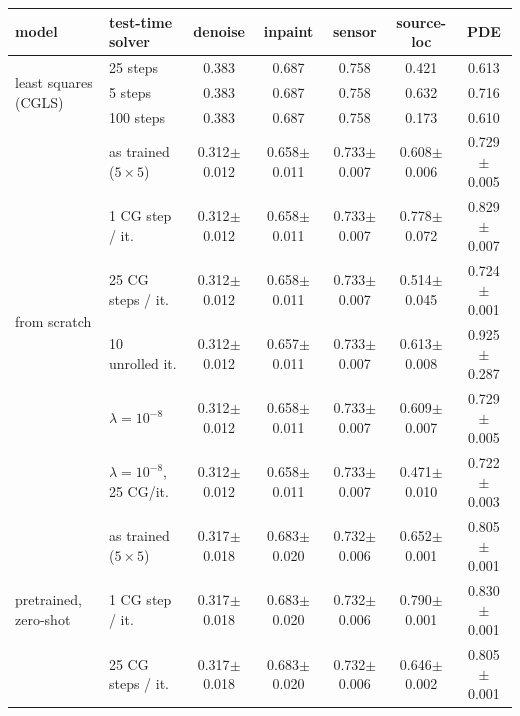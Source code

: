 \begin{tabular}{llccccc}
\toprule
model & test-time solver & denoise & inpaint & sensor & source-loc & PDE \\
\midrule
\multirow{3}{*}{least squares (CGLS)} & 25 steps & 0.383 & 0.687 & 0.758 & 0.421 & 0.613 \\
 & 5 steps & 0.383 & 0.687 & 0.758 & 0.632 & 0.716 \\
 & 100 steps & 0.383 & 0.687 & 0.758 & 0.173 & 0.610 \\
\midrule
\multirow{6}{*}{from scratch} & as trained ($5 \times 5$) & 0.312{\scriptsize$\pm$0.012} & 0.658{\scriptsize$\pm$0.011} & 0.733{\scriptsize$\pm$0.007} & 0.608{\scriptsize$\pm$0.006} & 0.729{\scriptsize$\pm$0.005} \\
 & 1 CG step / it. & 0.312{\scriptsize$\pm$0.012} & 0.658{\scriptsize$\pm$0.011} & 0.733{\scriptsize$\pm$0.007} & 0.778{\scriptsize$\pm$0.072} & 0.829{\scriptsize$\pm$0.007} \\
 & 25 CG steps / it. & 0.312{\scriptsize$\pm$0.012} & 0.658{\scriptsize$\pm$0.011} & 0.733{\scriptsize$\pm$0.007} & 0.514{\scriptsize$\pm$0.045} & 0.724{\scriptsize$\pm$0.001} \\
 & 10 unrolled it. & 0.312{\scriptsize$\pm$0.012} & 0.657{\scriptsize$\pm$0.011} & 0.733{\scriptsize$\pm$0.007} & 0.613{\scriptsize$\pm$0.008} & 0.925{\scriptsize$\pm$0.287} \\
 & $\lambda = 10^{-8}$ & 0.312{\scriptsize$\pm$0.012} & 0.658{\scriptsize$\pm$0.011} & 0.733{\scriptsize$\pm$0.007} & 0.609{\scriptsize$\pm$0.007} & 0.729{\scriptsize$\pm$0.005} \\
 & $\lambda = 10^{-8}$, 25 CG/it. & 0.312{\scriptsize$\pm$0.012} & 0.658{\scriptsize$\pm$0.011} & 0.733{\scriptsize$\pm$0.007} & 0.471{\scriptsize$\pm$0.010} & 0.722{\scriptsize$\pm$0.003} \\
\midrule
\multirow{6}{*}{pretrained, zero-shot} & as trained ($5 \times 5$) & 0.317{\scriptsize$\pm$0.018} & 0.683{\scriptsize$\pm$0.020} & 0.732{\scriptsize$\pm$0.006} & 0.652{\scriptsize$\pm$0.001} & 0.805{\scriptsize$\pm$0.001} \\
 & 1 CG step / it. & 0.317{\scriptsize$\pm$0.018} & 0.683{\scriptsize$\pm$0.020} & 0.732{\scriptsize$\pm$0.006} & 0.790{\scriptsize$\pm$0.001} & 0.830{\scriptsize$\pm$0.001} \\
 & 25 CG steps / it. & 0.317{\scriptsize$\pm$0.018} & 0.683{\scriptsize$\pm$0.020} & 0.732{\scriptsize$\pm$0.006} & 0.646{\scriptsize$\pm$0.002} & 0.805{\scriptsize$\pm$0.001} \\

\end{tabular}
